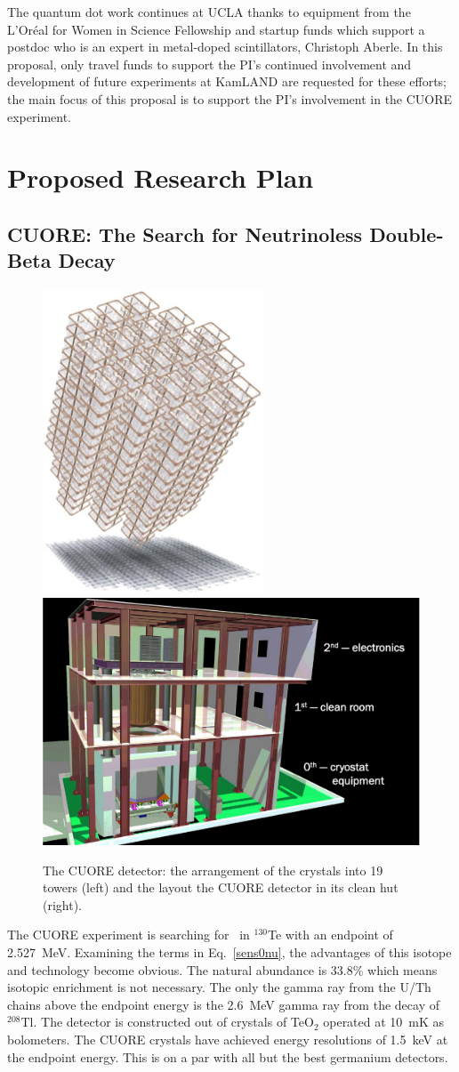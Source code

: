 The quantum dot work continues at UCLA thanks to equipment from the L'Or\'{e}al for Women in Science Fellowship and startup funds which support a postdoc who is an expert in metal-doped scintillators, Christoph Aberle. In this proposal, only travel funds to support the PI's continued involvement and development of future experiments at KamLAND are requested for these efforts; the main focus of this proposal is to support the PI's involvement in the CUORE experiment.

\section{Proposed Research Plan}
\subsection{CUORE:  The Search for Neutrinoless Double-Beta Decay}
\begin{figure}
\begin{center}
\includegraphics[width=0.225\columnwidth]{towers.jpg} 
\includegraphics[width=0.505\columnwidth]{CUORE-hut-cross-section-labeled.pdf} 
\end{center}
\caption{\label{layoutCuore} The CUORE detector: the arrangement of the crystals into 19 towers (left) and the layout the CUORE detector in its clean hut (right).  }
\end{figure}

The CUORE experiment is searching for \zeronu~in $^{130}$Te with an endpoint of 2.527~MeV. Examining the terms in Eq.~\ref{sens0nu}, the advantages of this isotope and technology become obvious. The natural abundance is 33.8\% which means isotopic enrichment is not necessary. The only the gamma ray from the U/Th chains above the endpoint energy is the 2.6~MeV gamma ray from the decay of $^{208}$Tl.  The detector is constructed out of crystals of TeO$_{2}$  operated at 10~mK as bolometers. The CUORE crystals have achieved energy resolutions of 1.5~keV at the endpoint energy. This is on a par with all but the best germanium detectors. 

